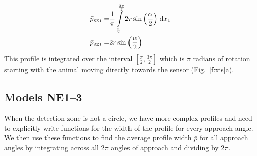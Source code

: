 \begin{align}
    \bar{p}_{\text{\tiny{SE1}}} =&\frac{1}{\pi} \int\limits_{\frac{\pi}{2}}^{\frac{3 \pi}{2}}2 r \sin{\left (\frac{\alpha}{2} \right )}\;\mathrm{d}x_{1}\label{pSE1Def}\\
    \bar{p}_{\text{\tiny{SE1}}}  =& 2 r \sin{\left (\frac{\alpha}{2} \right )}\label{pSE1Sln}
\end{align}
This profile is integrated over the interval $[\frac{\pi}{2}, \frac{3\pi}{2}]$ which is $\pi$ radians of rotation starting with the animal moving directly towards the sensor (Fig.~\ref{f:xis}a).

\subsection{ Models NE1--3} \label{NE}

When the detection zone is not a circle, we have more complex profiles  and need to explicitly write functions for the width of the profile for every approach angle. We then use these functions to find the average profile width $\bar{p}$ for all approach angles by integrating across all $2\pi$ angles of approach and dividing by $2\pi$. 




